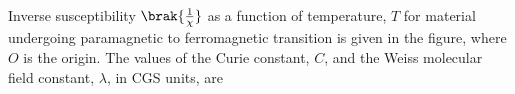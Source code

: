 \iffalse

\chapter{2012}
\section{ph}
\author{AI24BTECH11023 - Tarun Reddy Pakala}
\fi

\item Inverse susceptibility $\brak{\frac{1}{\chi}}$ as a function of temperature, $T$ for material undergoing paramagnetic to ferromagnetic transition is given in the figure, where $O$ is the origin. The values of the Curie constant, $C$, and the Weiss molecular field constant, $\lambda$, in CGS units, are
	

